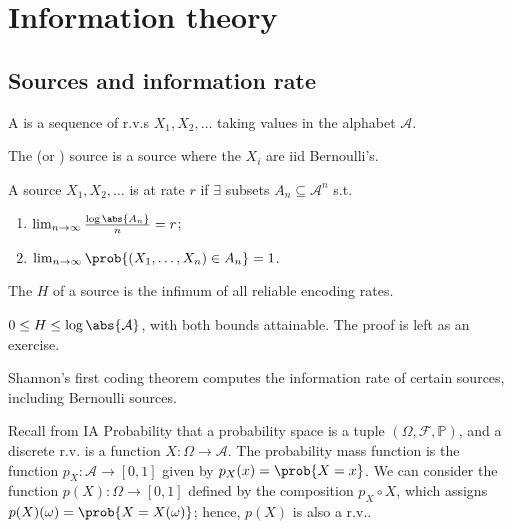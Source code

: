 \section{Information theory}

\subsection{Sources and information rate}
\begin{definition}[Source]
    A  is a sequence of r.v.s $X_1, X_2, \dots$ taking values in the alphabet $\mathcal A$.
\end{definition}

\begin{example}
    The  (or ) source is a source where the $X_i$ are iid Bernoulli's.
\end{example}

\begin{definition}
    A source $X_1, X_2, \dots$ is  at rate $r$ if $\exists$ subsets $A_n \subseteq \mathcal A^n$ s.t.
    \begin{enumerate}
        \item $\lim_{n \to \infty} \frac{\log \abs{A_n}}{n} = r$;
        \item $\lim_{n \to \infty} \prob{(X_1, \dots, X_n) \in A_n} = 1$.
    \end{enumerate}
\end{definition}

\begin{definition}
    The  $H$ of a source is the infimum of all reliable encoding rates.
\end{definition}

\begin{example}
    $0 \leq H \leq \log\abs{\mathcal A}$, with both bounds attainable.
    The proof is left as an exercise.
\end{example}

Shannon's first coding theorem computes the information rate of certain sources, including Bernoulli sources.

Recall from IA Probability that a probability space is a tuple $(\Omega, \mathcal F, \mathbb P)$, and a discrete r.v. is a function $X \colon \Omega \to \mathcal A$.
The probability mass function is the function $p_X \colon \mathcal A \to [0,1]$ given by $p_X(x) = \prob{X = x}$.
We can consider the function $p(X) \colon \Omega \to [0,1]$ defined by the composition $p_X \circ X$, which assigns $p(X)(\omega) = \prob{X = X(\omega)}$; hence, $p(X)$ is also a r.v..

